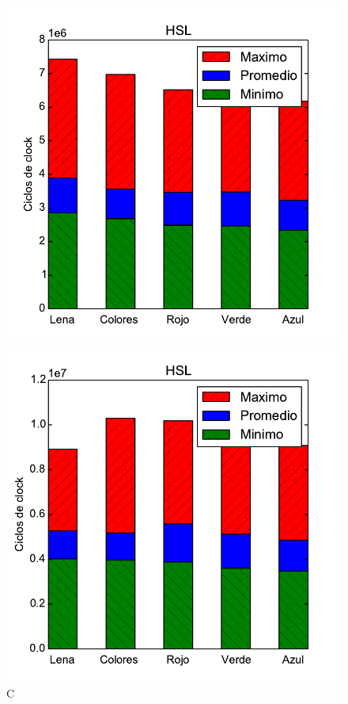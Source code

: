 \begin{figure}[h!]
	\centering
	\includegraphics[scale=0.5]{images/hsl_comparationC}
	\caption{C}
	\includegraphics[scale=0.5]{images/hsl_comparationASM1}

\end{figure}
